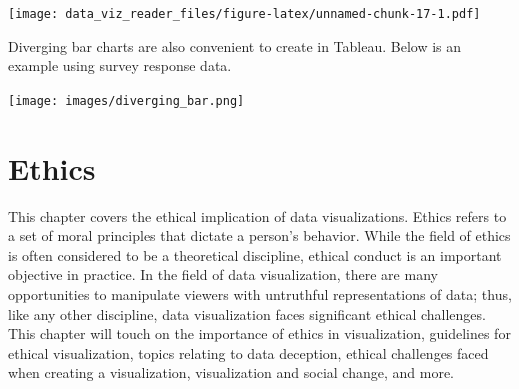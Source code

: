 \documentclass[]{book}
\newenvironment{Shaded}{\begin{snugshade}}{\end{snugshade}}
\newcommand{\CommentTok}[1]{\textcolor[rgb]{0.56,0.35,0.01}{\textit{#1}}}
\newcommand{\DataTypeTok}[1]{\textcolor[rgb]{0.13,0.29,0.53}{#1}}
\newcommand{\DecValTok}[1]{\textcolor[rgb]{0.00,0.00,0.81}{#1}}
\newcommand{\KeywordTok}[1]{\textcolor[rgb]{0.13,0.29,0.53}{\textbf{#1}}}
\newcommand{\NormalTok}[1]{#1}
\newcommand{\OperatorTok}[1]{\textcolor[rgb]{0.81,0.36,0.00}{\textbf{#1}}}
\newcommand{\StringTok}[1]{\textcolor[rgb]{0.31,0.60,0.02}{#1}}
\begin{document}
\begin{Shaded}
\end{Shaded}

\texttt{[image: data\_viz\_reader\_files/figure-latex/unnamed-chunk-17-1.pdf]}

Diverging bar charts are also convenient to create in Tableau. Below is an example using survey response data.

\texttt{[image: images/diverging\_bar.png]}

\hypertarget{ethics}{%
\chapter{Ethics}\label{ethics}}

This chapter covers the ethical implication of data visualizations. Ethics refers to a set of moral principles that dictate a person's behavior. While the field of ethics is often considered to be a theoretical discipline, ethical conduct is an important objective in practice. In the field of data visualization, there are many opportunities to manipulate viewers with untruthful representations of data; thus, like any other discipline, data visualization faces significant ethical challenges. This chapter will touch on the importance of ethics in visualization, guidelines for ethical visualization, topics relating to data deception, ethical challenges faced when creating a visualization, visualization and social change, and more.
\end{document}
